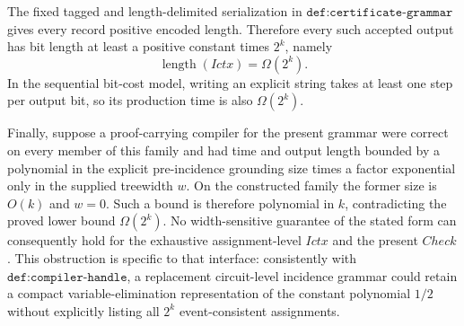 The fixed tagged and length-delimited serialization in \(\texttt{def:certificate-grammar}\) gives every record positive encoded length.  Therefore every such accepted output has bit length at least a positive constant times \(2^k\), namely
\[
\operatorname{length}(Ictx)=\Omega(2^k).
\]
In the sequential bit-cost model, writing an explicit string takes at least one step per output bit, so its production time is also \(\Omega(2^k)\).

Finally, suppose a proof-carrying compiler for the present grammar were correct on every member of this family and had time and output length bounded by a polynomial in the explicit pre-incidence grounding size times a factor exponential only in the supplied treewidth \(w\).  On the constructed family the former size is \(O(k)\) and \(w=0\).  Such a bound is therefore polynomial in \(k\), contradicting the proved lower bound \(\Omega(2^k)\).  No width-sensitive guarantee of the stated form can consequently hold for the exhaustive assignment-level \(Ictx\) and the present \(Check\).  This obstruction is specific to that interface: consistently with \(\texttt{def:compiler-handle}\), a replacement circuit-level incidence grammar could retain a compact variable-elimination representation of the constant polynomial \(1/2\) without explicitly listing all \(2^k\) event-consistent assignments.
